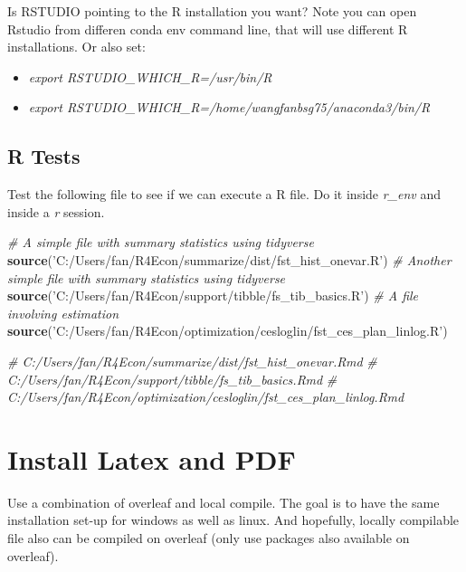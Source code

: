 \documentclass[]{article}
\newenvironment{Shaded}{\begin{snugshade}}{\end{snugshade}}
\newcommand{\CommentTok}[1]{\textcolor[rgb]{0.56,0.35,0.01}{\textit{#1}}}
\newcommand{\KeywordTok}[1]{\textcolor[rgb]{0.13,0.29,0.53}{\textbf{#1}}}
\newcommand{\NormalTok}[1]{#1}
\newcommand{\StringTok}[1]{\textcolor[rgb]{0.31,0.60,0.02}{#1}}
\providecommand{\tightlist}{%
  \setlength{\itemsep}{0pt}\setlength{\parskip}{0pt}}
\begin{document}
Is RSTUDIO pointing to the R installation you want? Note you can open
Rstudio from differen conda env command line, that will use different R
installations. Or also set:

\begin{itemize}
\tightlist
\item
  \emph{export RSTUDIO\_WHICH\_R=/usr/bin/R}
\item
  \emph{export RSTUDIO\_WHICH\_R=/home/wangfanbsg75/anaconda3/bin/R}
\end{itemize}

\hypertarget{r-tests}{%
\subsection{R Tests}\label{r-tests}}

Test the following file to see if we can execute a R file. Do it inside
\emph{r\_env} and inside a \emph{r} session.

\begin{Shaded}
\begin{Highlighting}[]
\CommentTok{# A simple file with summary statistics using tidyverse}
\KeywordTok{source}\NormalTok{(}\StringTok{'C:/Users/fan/R4Econ/summarize/dist/fst_hist_onevar.R'}\NormalTok{)}
\CommentTok{# Another simple file with summary statistics using tidyverse}
\KeywordTok{source}\NormalTok{(}\StringTok{'C:/Users/fan/R4Econ/support/tibble/fs_tib_basics.R'}\NormalTok{)}
\CommentTok{# A file involving estimation}
\KeywordTok{source}\NormalTok{(}\StringTok{'C:/Users/fan/R4Econ/optimization/cesloglin/fst_ces_plan_linlog.R'}\NormalTok{)}

\CommentTok{# C:/Users/fan/R4Econ/summarize/dist/fst_hist_onevar.Rmd}
\CommentTok{# C:/Users/fan/R4Econ/support/tibble/fs_tib_basics.Rmd}
\CommentTok{# C:/Users/fan/R4Econ/optimization/cesloglin/fst_ces_plan_linlog.Rmd}
\end{Highlighting}
\end{Shaded}

\hypertarget{install-latex-and-pdf}{%
\section{Install Latex and PDF}\label{install-latex-and-pdf}}

Use a combination of overleaf and local compile. The goal is to have the
same installation set-up for windows as well as linux. And hopefully,
locally compilable file also can be compiled on overleaf (only use
packages also available on overleaf).
\end{document}
